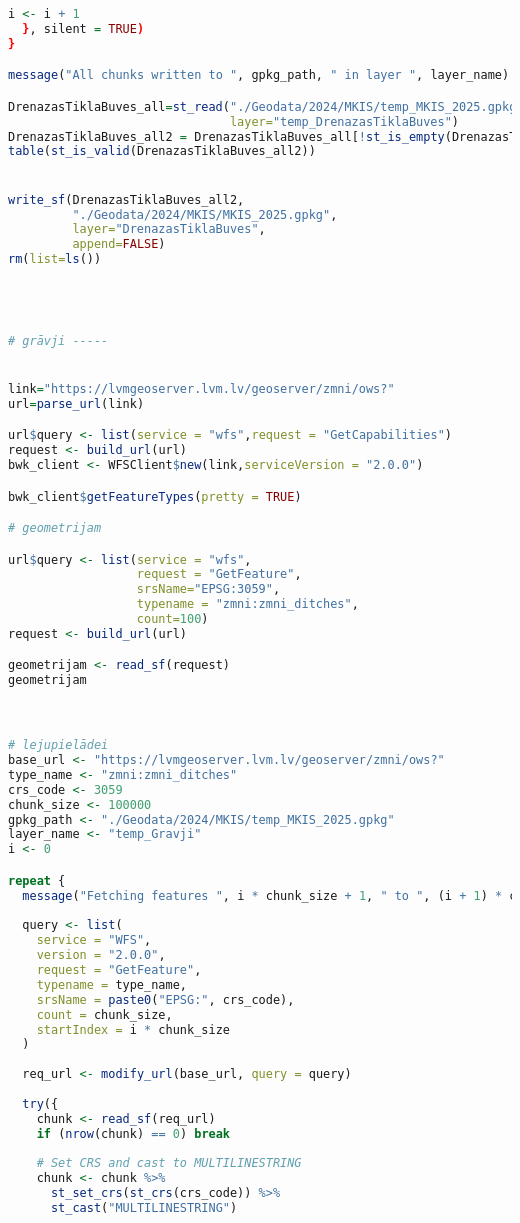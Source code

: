 \documentclass[
]{book}
\begin{document}
\begin{lstlisting}[language=R]
    i <- i + 1
  }, silent = TRUE)
}

message("All chunks written to ", gpkg_path, " in layer ", layer_name)

DrenazasTiklaBuves_all=st_read("./Geodata/2024/MKIS/temp_MKIS_2025.gpkg",
                               layer="temp_DrenazasTiklaBuves")
DrenazasTiklaBuves_all2 = DrenazasTiklaBuves_all[!st_is_empty(DrenazasTiklaBuves_all),,drop=FALSE] # 0
table(st_is_valid(DrenazasTiklaBuves_all2))


write_sf(DrenazasTiklaBuves_all2,
         "./Geodata/2024/MKIS/MKIS_2025.gpkg",
         layer="DrenazasTiklaBuves",
         append=FALSE)
rm(list=ls())




# grāvji -----


link="https://lvmgeoserver.lvm.lv/geoserver/zmni/ows?"
url=parse_url(link)

url$query <- list(service = "wfs",request = "GetCapabilities")
request <- build_url(url)
bwk_client <- WFSClient$new(link,serviceVersion = "2.0.0")

bwk_client$getFeatureTypes(pretty = TRUE)

# geometrijam

url$query <- list(service = "wfs",
                  request = "GetFeature",
                  srsName="EPSG:3059",
                  typename = "zmni:zmni_ditches",
                  count=100)
request <- build_url(url)

geometrijam <- read_sf(request)
geometrijam



# lejupielādei
base_url <- "https://lvmgeoserver.lvm.lv/geoserver/zmni/ows?"
type_name <- "zmni:zmni_ditches"
crs_code <- 3059
chunk_size <- 100000
gpkg_path <- "./Geodata/2024/MKIS/temp_MKIS_2025.gpkg"
layer_name <- "temp_Gravji"
i <- 0

repeat {
  message("Fetching features ", i * chunk_size + 1, " to ", (i + 1) * chunk_size, "...")
  
  query <- list(
    service = "WFS",
    version = "2.0.0",
    request = "GetFeature",
    typename = type_name,
    srsName = paste0("EPSG:", crs_code),
    count = chunk_size,
    startIndex = i * chunk_size
  )
  
  req_url <- modify_url(base_url, query = query)
  
  try({
    chunk <- read_sf(req_url)
    if (nrow(chunk) == 0) break
    
    # Set CRS and cast to MULTILINESTRING
    chunk <- chunk %>%
      st_set_crs(st_crs(crs_code)) %>%
      st_cast("MULTILINESTRING")
    

\end{lstlisting}
\end{document}
